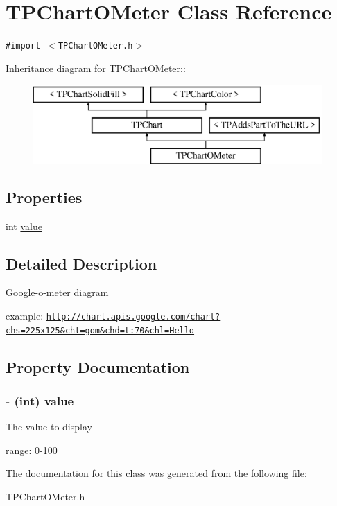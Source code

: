 \hypertarget{interface_t_p_chart_o_meter}{
\section{TPChartOMeter Class Reference}
\label{interface_t_p_chart_o_meter}
}
{\tt \#import $<$TPChartOMeter.h$>$}

Inheritance diagram for TPChartOMeter::\begin{figure}[H]
\begin{center}
\leavevmode
\includegraphics[height=3cm]{interface_t_p_chart_o_meter}
\end{center}
\end{figure}
\subsection*{Properties}
\begin{CompactItemize}
\item 
int \hyperlink{interface_t_p_chart_o_meter_f28c79861d8123f6294791942243c0aa}{value}
\end{CompactItemize}


\subsection{Detailed Description}
Google-o-meter diagram\par
 example: \href{http://chart.apis.google.com/chart?chs=225x125&cht=gom&chd=t:70&chl=Hello}{\tt http://chart.apis.google.com/chart?chs=225x125\&cht=gom\&chd=t:70\&chl=Hello} 

\subsection{Property Documentation}
\hypertarget{interface_t_p_chart_o_meter_f28c79861d8123f6294791942243c0aa}{
\subsubsection[{value}]{\setlength{\rightskip}{0pt plus 5cm}- (int) value}}
\label{interface_t_p_chart_o_meter_f28c79861d8123f6294791942243c0aa}


The value to display\par
 range: 0-100 

The documentation for this class was generated from the following file:\begin{CompactItemize}
\item 
TPChartOMeter.h\end{CompactItemize}

